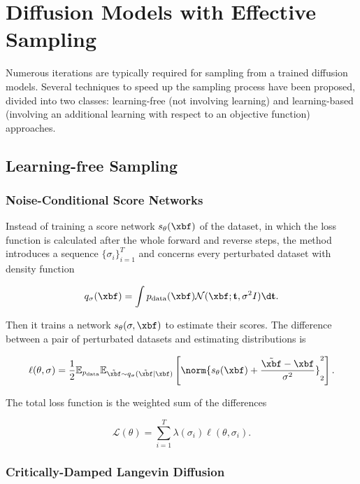 \section{Diffusion Models with Effective Sampling}

Numerous iterations are typically required for sampling from a trained diffusion models. Several techniques to speed up the sampling process have been proposed, divided into two classes: learning-free (not involving learning) and learning-based (involving an additional learning with respect to an objective function) approaches.

\subsection{Learning-free Sampling}

\subsubsection{Noise-Conditional Score Networks}

Instead of training a score network $s_\theta(\xbf)$ of the dataset, in which the loss function is calculated after the whole forward and reverse steps, the method introduces a sequence $\{\sigma_i\}_{i=1}^T$ \cite{song2019generative} and concerns every perturbated dataset with density function

\begin{equation}
  q_\sigma(\xbf)=\int p_{\text{data}}(\xbf)\mathcal{N}(\xbf; \mathbf{t},\sigma^2I)\d \mathbf{t}.
\end{equation}

Then it trains a network $s_\theta(\sigma, \xbf)$ to estimate their scores. The difference between a pair of perturbated datasets and estimating distributions is

\begin{equation}
  \ell(\theta,\sigma) = \dfrac{1}{2}\mathbb{E}_{p_{\text{data}}}\mathbb{E}_{\tilde{\xbf}\sim q_\sigma(\tilde{\xbf}|\xbf)}\left[\norm{s_\theta(\xbf)+\dfrac{\tilde{\xbf}-\xbf}{\sigma^2}}^2_2\right].
\end{equation}

The total loss function is the weighted sum of the differences

\begin{equation}
  \mathcal{L}(\theta)=\sum\limits_{i=1}^T \lambda(\sigma_i)\ell(\theta,\sigma_i).
\end{equation}


\subsubsection{Critically-Damped Langevin Diffusion}



